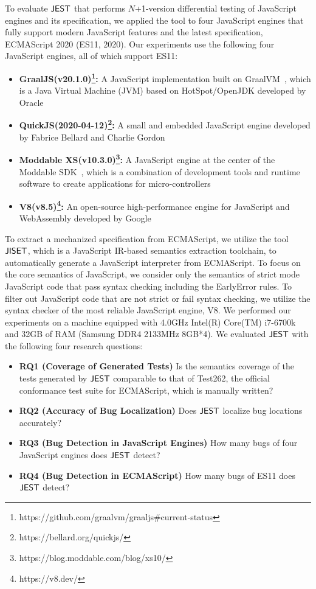 To evaluate $\tool$ that performs $N$+1-version differential testing of JavaScript
engines and its specification, we applied the tool to four JavaScript engines that
fully support modern JavaScript features and the latest specification,
ECMAScript 2020 (ES11, 2020).  Our experiments use the following four JavaScript
engines, all of which support ES11:
\begin{itemize}
  \item \textbf{GraalJS(v20.1.0)\footnote{https://github.com/graalvm/graaljs\#current-status}:} A JavaScript implementation built on
    GraalVM~\cite{graaljs}, which is a Java Virtual Machine (JVM) based on
    HotSpot/OpenJDK developed by Oracle
  \item \textbf{QuickJS(2020-04-12)\footnote{https://bellard.org/quickjs/}:} A small and embedded JavaScript engine developed by
    Fabrice Bellard and Charlie Gordon~\cite{qjs}
  \item \textbf{Moddable XS(v10.3.0)\footnote{https://blog.moddable.com/blog/xs10/}:} A JavaScript engine at the center of the Moddable
    SDK~\cite{xs}, which is a combination of development tools and runtime
    software to create applications for micro-controllers
  \item \textbf{V8(v8.5)\footnote{https://v8.dev/}:} An open-source high-performance engine
for JavaScript and WebAssembly developed by Google~\cite{v8}
\end{itemize}
To extract a mechanized specification from ECMAScript, we utilize the tool
$\jiset$, which is a JavaScript IR-based semantics extraction
toolchain, to automatically generate a JavaScript interpreter from ECMAScript.
To focus on the core semantics of JavaScript, we consider only the semantics of strict mode
JavaScript code that pass syntax checking including the EarlyError rules.  To
filter out JavaScript code that are not strict or fail syntax checking,
we utilize the syntax checker of the most reliable JavaScript engine, V8.
We performed our experiments on a machine equipped with 4.0GHz Intel(R) Core(TM)
i7-6700k and 32GB of RAM (Samsung DDR4 2133MHz 8GB*4).  We evaluated $\tool$
with the following four research questions:
\begin{itemize}
\item {\bf RQ1 (Coverage of Generated Tests)} Is the semantics
coverage of the tests generated by $\tool$ comparable to that of Test262,
the official conformance test suite for ECMAScript, which is manually written?
\item {\bf RQ2 (Accuracy of Bug Localization)} Does $\tool$ localize bug locations
accurately?
\item {\bf RQ3 (Bug Detection in JavaScript Engines)} How many
bugs of four JavaScript engines does $\tool$ detect?
\item {\bf RQ4 (Bug Detection in ECMAScript)} How many
bugs of ES11 does $\tool$ detect?
\end{itemize}


